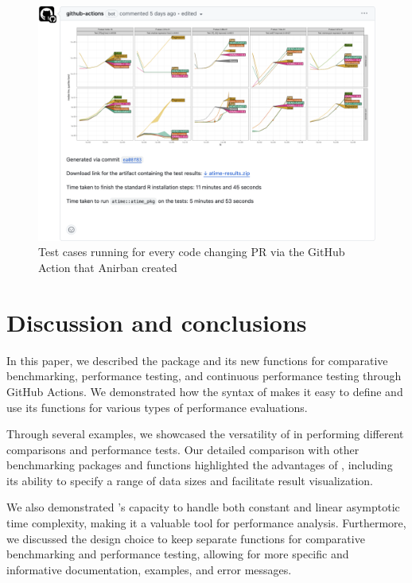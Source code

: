 \begin{figure}[H]
    \centering
    \includegraphics[width=1.0\linewidth]{figures/GHA2.png}
    \caption{Test cases running for every code changing PR via the GitHub Action that Anirban created}
    \label{fig:label5}
\end{figure}


\section{Discussion and conclusions}

In this paper, we described the  package and its new functions for comparative benchmarking, performance testing, and continuous performance testing through GitHub Actions. We demonstrated how the syntax of  makes it easy to define and use its functions for various types of performance evaluations.

Through several examples, we showcased the versatility of  in performing different comparisons and performance tests. Our detailed comparison with other benchmarking packages and functions highlighted the advantages of , including its ability to specify a range of data sizes and facilitate result visualization.

We also demonstrated 's capacity to handle both constant and linear asymptotic time complexity, making it a valuable tool for performance analysis. Furthermore, we discussed the design choice to keep separate functions for comparative benchmarking and performance testing, allowing for more specific and informative documentation, examples, and error messages.

